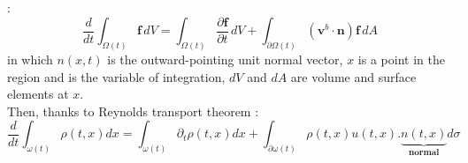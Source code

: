 \documentclass{report}
\newcommand*{\theorem}[1]{\noindent\textbf{\color{purple}{#1}}}
\theoremstyle{plain}
\theoremstyle{definition}
\theoremstyle{remark}
\begin{document}
\theorem{Reynolds transport theorem} : 
\begin{equation}
\frac{d}{dt}\int_{\Omega(t)} \mathbf{f}\,dV = \int_{\Omega(t)} \frac{\partial \mathbf{f}}{\partial t}\,dV + \int_{\partial \Omega(t)} \left(\mathbf{v}^b\cdot\mathbf{n}\right)\mathbf{f}\,dA
\end{equation}
in which $n(x,t)$ is the outward-pointing unit normal vector, $x$ is a point in the region and is the variable of integration, $dV$ and $dA$ are volume and surface elements at $x$.\\
Then, thanks to Reynolds transport theorem : \begin{equation}
\frac{d}{dt}\int_{\omega(t)}\rho(t,x)dx = \int_{\omega(t)}\partial_t\rho(t,x)dx + \int_{\partial\omega(t)}\rho(t,x)u(t,x).\underbrace{n(t,x)}_{\textbf{normal}}d\sigma
\end{equation}
\end{document}
